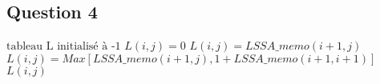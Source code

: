 \documentclass[11pt,a4paper]{article}
\begin{document}
	\subsection{Question 4}
	\begin{algorithm}
		\begin{algorithmic}[1]%
			\State $\text{tableau L initialisé à -1}$
					\State $L(i,j) = 0$
					\State $L(i,j) = LSSA\_memo(i+1,j)$
				\Else
					\State $L(i,j) = Max[LSSA\_memo(i+1,j), 1+LSSA\_memo(i+1,i+1)]$
				\EndIf
			\EndIf
			\State \Return $L(i,j)$
			\EndFunction
		\end{algorithmic}
	\end{algorithm}
\end{document}
